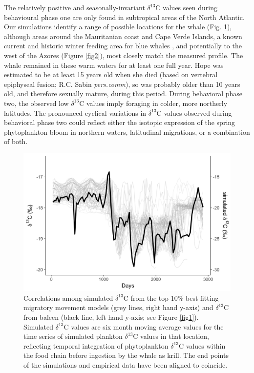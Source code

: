 \documentclass[a4paper,12pt]{article}
\begin{document}
The relatively positive and seasonally-invariant \(\delta^{13}\)C values seen during behavioural phase one are only found in subtropical areas of the North Atlantic. 
Our simulations identify a range of possible locations for the whale (Fig. \ref{fig3}), although areas around the Mauritanian coast and Cape Verde Islands, a known current and historic winter feeding area for blue whales \cite{baines2014upwellings,reeves2004historical}, and potentially to the west of the Azores (Figure \ref{fig2}), most closely match the measured profile. 
The whale remained in these warm waters for at least one full year. 
Hope was estimated to be at least 15 years old when she died (based on vertebral epiphyseal fusion; R.C. Sabin \textit{pers.comm}), so was probably older than 10 years old, and therefore sexually mature, during this period. 
During behavioral phase two, the observed low \(\delta^{13}\)C values imply foraging in colder, more northerly latitudes. 
The pronounced cyclical variations in \(\delta^{13}\)C values observed during behavioral phase two could reflect either the isotopic expression of the spring phytoplankton bloom in northern waters\cite{magozzi2017using}, latitudinal migrations, or a combination of both.

\begin{figure}
 \centering
  \includegraphics[width = \linewidth]{figures/Figure-3-blue-sims.png}
  \caption{Correlations among simulated $\delta^{13}$C from the top 10\% best fitting migratory movement models (grey lines, right hand y-axis) and $\delta^{13}$C from baleen (black line, left hand y-axis; see Figure \ref{fig1}). 
  Simulated $\delta^{13}$C values are six month moving average values for the time series of simulated plankton $\delta^{13}$C values in that location, reflecting temporal integration of phytoplankton $\delta^{13}$C values within the food chain before ingestion by the whale as krill. 
  The end points of the simulations and empirical data have been aligned to coincide.
}
  \label{fig3}
\end{figure}
\end{document}
